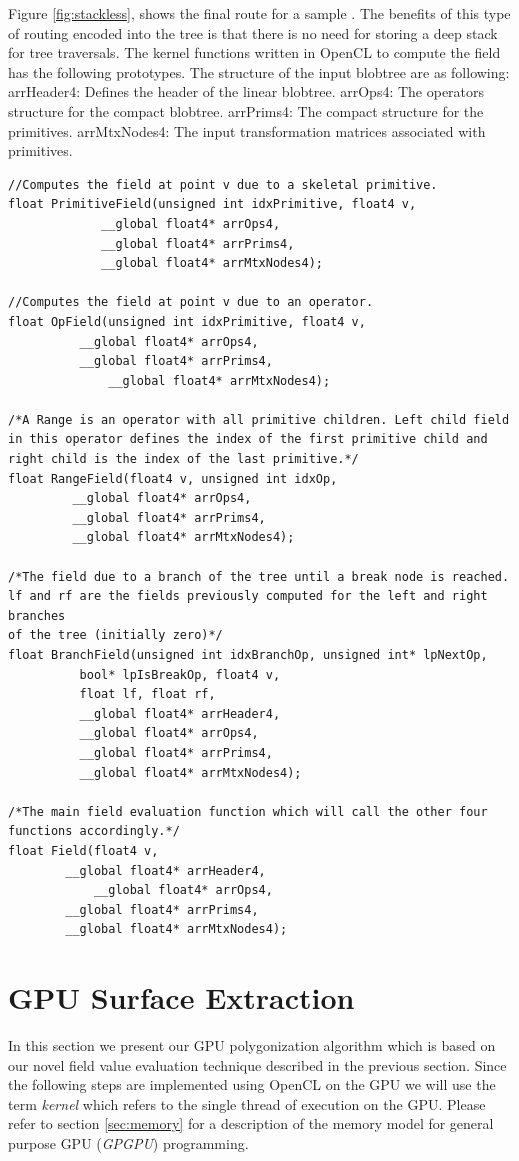 Figure \ref{fig:stackless}, shows the final route for a sample \blob. The benefits of this type of routing encoded into the tree
is that there is no need for storing a deep stack for tree traversals. The kernel functions written in OpenCL to compute the field
has the following prototypes. The structure of the input blobtree are as following:
arrHeader4: Defines the header of the linear blobtree.
arrOps4: The operators structure for the compact blobtree.
arrPrims4: The compact structure for the primitives.
arrMtxNodes4: The input transformation matrices associated with primitives.


\begin{lstlisting}[frame=single]
//Computes the field at point v due to a skeletal primitive. 
float PrimitiveField(unsigned int idxPrimitive, float4 v,			
		     __global float4* arrOps4,
		     __global float4* arrPrims4, 
		     __global float4* arrMtxNodes4);

//Computes the field at point v due to an operator.
float OpField(unsigned int idxPrimitive, float4 v,			
	      __global float4* arrOps4,
	      __global float4* arrPrims4, 
              __global float4* arrMtxNodes4);

/*A Range is an operator with all primitive children. Left child field 
in this operator defines the index of the first primitive child and 
right child is the index of the last primitive.*/
float RangeField(float4 v, unsigned int idxOp, 						
		 __global float4* arrOps4,
		 __global float4* arrPrims4, 
		 __global float4* arrMtxNodes4);

/*The field due to a branch of the tree until a break node is reached. 
lf and rf are the fields previously computed for the left and right branches 
of the tree (initially zero)*/
float BranchField(unsigned int idxBranchOp, unsigned int* lpNextOp, 
		  bool* lpIsBreakOp, float4 v, 
		  float lf, float rf,
		  __global float4* arrHeader4,
		  __global float4* arrOps4,
		  __global float4* arrPrims4, 
		  __global float4* arrMtxNodes4);
		  
/*The main field evaluation function which will call the other four functions accordingly.*/
float Field(float4 v,			
	    __global float4* arrHeader4,
            __global float4* arrOps4,
	    __global float4* arrPrims4, 
	    __global float4* arrMtxNodes4);
\end{lstlisting}


\section{GPU Surface Extraction}
In this section we present our GPU polygonization algorithm which is based on our novel field value evaluation technique described
in the previous section. Since the following steps are implemented using OpenCL on the GPU we will use the term \textit{kernel} which 
refers to the single thread of execution on the GPU. Please refer to section \ref{sec:memory} for a description of the memory model for
general purpose GPU (\textit{GPGPU}) programming.

